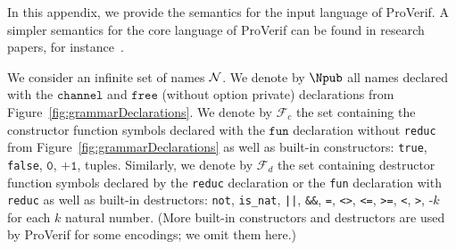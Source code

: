 \documentclass{book}
\begin{document}
\newcommand{\eqth}{{\cal E}}
\newcommand{\eeqth}[2]{{#1} =_{\eqth} {#2}}
\newcommand{\eeqththree}[3]{{#1} =_{\eqth} {#2} =_{\eqth} {#3}}
\newcommand{\neqth}[2]{{#1} \neq_{\eqth} {#2}}
\newcommand{\neqoptth}[2]{#1 \neq #2}

\newcommand{\interv}[2]{\{ {#1}, \ldots, {#2}\}}

\newcommand{\fail}{\texttt{fail}}
\newcommand{\true}{\texttt{true}}
\newcommand{\false}{\texttt{false}}
\newcommand{\outP}[2]{\texttt{out(}#1\texttt{,}#2\texttt{)}}
\newcommand{\inP}[2]{\texttt{in(}#1\texttt{,}#2\texttt{)}}
\newcommand{\zero}{\texttt{0}}

\newcommand{\ptstep}[1]{\xrightarrow{#1}_t}
\newcommand{\patstep}[1]{\xrightarrow{#1}_p}
\newcommand{\pstep}[1]{\xrightarrow{#1}}

\newcommand{\matches}{\mathrm{matches}}
\newcommand{\subst}[2]{^{#1}/_{#2}}
\newcommand{\pat}{\mathit{pat}}
\newcommand{\cpat}{\mathit{cpat}}
\newcommand{\isnat}{\mathit{nat}}
\newcommand{\isnotnat}{\neg\mathit{nat}}
\newcommand{\with}{\;||\;}
\newcommand{\suc}{\texttt{+1}}

\newcommand{\Fd}{\mathcal{F}_d}
\newcommand{\Fc}{\mathcal{F}_c}
\newcommand{\Fp}{\mathcal{F}_p}

\newcommand{\tupleseqtwo}[2]{\texttt{(}#1\texttt{,}\ldots\texttt{,}#2\texttt{)}}
\newcommand{\tupleseqi}[4]{\texttt{(}#1\texttt{,}\ldots\texttt{,}#2\texttt{,}#3\texttt{,}\ldots\texttt{,}#4\texttt{)}}
\newcommand{\tupleseqm}[3]{\texttt{(}{#1}_1\texttt{,}\ldots\texttt{,}{#1}_{i-1}\texttt{,}#2\texttt{,}{#3}_{i+1}\texttt{,}\ldots\texttt{,}{#3}_n\texttt{)}}
\newcommand{\hole}{\rule[0pt]{0.3cm}{0.4pt}}

\newcommand{\fgeq}{\texttt{>=}}
\newcommand{\synchro}{\mathrm{synchro}}


In this appendix, we provide the semantics for the input language of ProVerif. A simpler semantics for the core language of ProVerif can be found in research papers, for instance~\cite{Blanchet16b}.

We consider an infinite set of names $\cal N$. We denote by $\Npub$ all names declared with the $\texttt{channel}$ and $\texttt{free}$ (without option private) declarations from Figure~\ref{fig:grammarDeclarations}. We denote by $\Fc$ the set containing the constructor function symbols declared with the $\texttt{fun}$ declaration without \texttt{reduc} from Figure~\ref{fig:grammarDeclarations} as well as built-in constructors: \texttt{true}, \texttt{false}, $\zero$, $\suc$, tuples. Similarly, we denote by $\Fd$ the set containing destructor function symbols declared by the \texttt{reduc} declaration or the \texttt{fun} declaration with \texttt{reduc} as well as built-in destructors: \texttt{not}, \texttt{is\_nat}, \texttt{||}, \texttt{\&\&}, \texttt{=}, \texttt{<>}, \texttt{<=}, \texttt{>=}, \texttt{<}, \texttt{>}, $\texttt{-}k$ for each $k$ natural number. (More built-in constructors and destructors are used by ProVerif for some encodings; we omit them here.)
\end{document}
